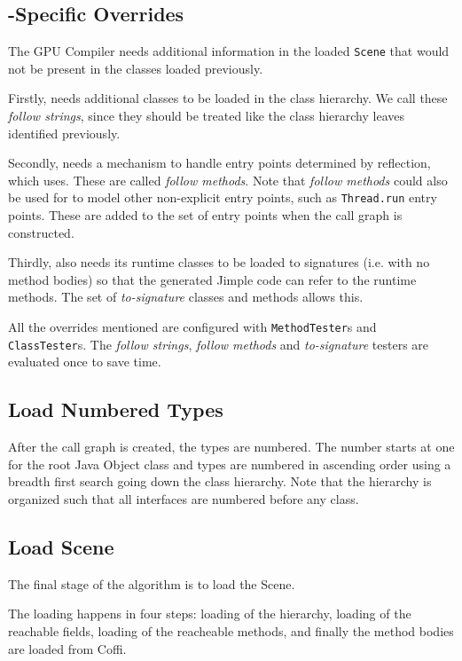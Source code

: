 \documentclass[preprint]{sigplanconf}
\begin{document}
\subsection{\rb{}-Specific Overrides}
\label{sec:followtosig}

The \rb GPU Compiler needs additional information in the loaded {\tt Scene} that would not be present in the classes loaded previously.

Firstly, \rb needs additional classes to be loaded in the class hierarchy. We call these \emph{follow strings}, since they should be treated like the class hierarchy leaves identified previously.

Secondly, \rb needs a mechanism to handle entry points determined by reflection, which \rb uses. These are called \emph{follow methods}. Note that \emph{follow methods} could also be used for to model other non-explicit entry points, such as {\tt Thread.run} entry points. These are added to the set of entry points when the call graph is constructed.

Thirdly, \rb also needs its runtime classes to be loaded to signatures (i.e. with no method bodies) so that the generated Jimple code can refer to the runtime methods. The set of \emph{to-signature} classes and methods allows this.

All the overrides mentioned are configured with {\tt MethodTester}s and {\tt ClassTester}s. The \emph{follow strings}, \emph{follow methods} and \emph{to-signature} testers are evaluated once to save time.

\subsection{Load Numbered Types}
\label{sec:numbering}
After the call graph is created, the types are numbered. The number starts at one for the root Java Object class and types are numbered in ascending order using a breadth first search going down the class hierarchy. Note that the hierarchy is organized such that all interfaces are numbered before any class.

\subsection{Load Scene}
\label{sec:loadscene}
The final stage of the algorithm is to load the Scene. 

The loading happens in four steps: loading of the hierarchy, loading of the reachable fields, loading of the reacheable methods, and finally the method bodies are loaded from Coffi.
\end{document}
